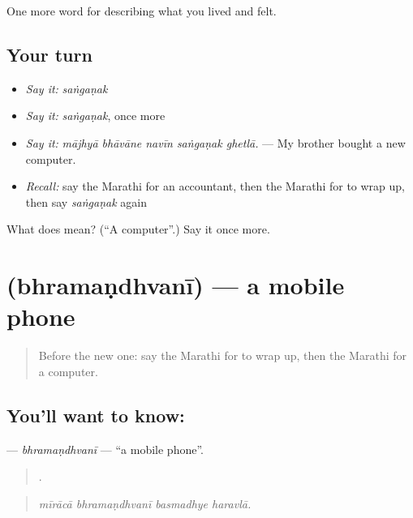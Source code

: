 \begin{grammarlens}[title={What you've built}]
One more word for describing what you lived and felt.
\end{grammarlens}

\subsection*{Your turn}
\begin{itemize}
\raggedright
  \item \emph{Say it:} \emph{saṅgaṇak}
  \item \emph{Say it:} \emph{saṅgaṇak}, once more
  \item \emph{Say it:} \emph{mājhyā bhāvāne navīn saṅgaṇak ghetlā.} — My brother bought a new computer.
  \item \emph{Recall:} say the Marathi for an accountant, then the Marathi for to wrap up, then say \emph{saṅgaṇak} again
\end{itemize}

\begin{tcolorbox}[breakable,colback=teal!4,colframe=teal!35!black,title={Before you move on}]
What does  mean? (\textquotedblleft{}A computer\textquotedblright{}.) Say it once more.
\end{tcolorbox}
\section[\texorpdfstring{\mr{भ्रमणध्वनी} (bhramaṇdhvanī)}{भ्रमणध्वनी (bhramaṇdhvanī)}]{ (bhramaṇdhvanī) — a mobile phone}

\label{lesson:MR-C516-bhramandhvani}



\begin{quote}
Before the new one: say the Marathi for to wrap up, then the Marathi for a computer.
\end{quote}

\subsection*{You'll want to know: }
\textbf{} — \emph{bhramaṇdhvanī} — \textquotedblleft{}a mobile phone\textquotedblright{}.

\begin{quote}
   .
\end{quote}

\begin{quote}
\emph{mīrācā bhramaṇdhvanī basmadhye haravlā.}
\end{quote}

